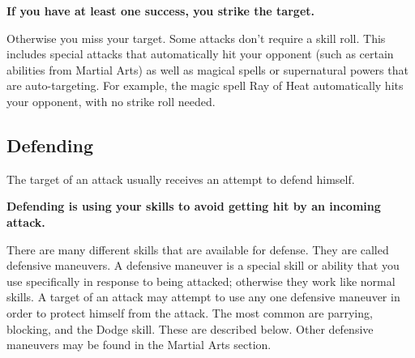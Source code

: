 \documentclass[twoside]{book}
\begin{document}
 \textbf{ If you have at least one success, you strike the
                target. }

  Otherwise you miss your target.
             Some attacks don't require a skill roll. This
               includes special attacks that automatically hit your
               opponent (such as certain abilities from Martial Arts) as
               well as magical spells or supernatural powers that are
               auto-targeting. For example, the magic spell Ray of Heat
               automatically hits your opponent, with no strike roll
               needed. 
    

\subsection{Defending}
     The target of an attack usually receives an attempt
              to defend himself.
               

 \textbf{ Defending is using your skills to avoid getting hit
                by an incoming attack. }

  There are many different
                skills that are available for defense. They are called
                defensive maneuvers. A defensive maneuver is a special
                skill or ability that you use specifically in response to
                being attacked; otherwise they work like normal skills. A
                target of an attack may attempt to use any one defensive
                maneuver in order to protect himself from the attack. The
                most common are parrying, blocking, and the Dodge skill.
                These are described below. Other defensive maneuvers may
                be found in the Martial Arts section.
            
\end{document}
